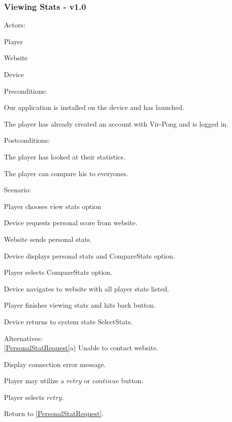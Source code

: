 \documentclass[12pt]{article}
\newenvironment{itemize*}%
  {\begin{itemize}%
  	\setlength{\parsep}{0pt}
    \setlength{\itemsep}{0pt}%
    \setlength{\parskip}{0pt}}%
  {\end{itemize}}
\newenvironment{enumerate*}%
  {\begin{enumerate}%
  	\setlength{\parsep}{0pt}
    \setlength{\itemsep}{0pt}%
    \setlength{\parskip}{0pt}}%
  {\end{enumerate}}
\begin{document}
\subsubsection*{Viewing Stats - v1.0}
Actors:
\begin{itemize*}
\item Player
\item Website
\item Device
\end{itemize*}
Preconditions:
\begin{itemize*}
\item Our application is installed on the device and has launched.
\item The player has already created an account with Vir-Pong and is logged in.
\end{itemize*}
Postconditions:
\begin{itemize*}
\item The player has looked at their statistics.
\item The player can compare his to everyones.
\end{itemize*}
Scenario:
\begin{enumerate*}
\item \label{SelectStats}Player chooses view stats option
\item \label{PersonalStatRequest}Device requests personal score from website.
\item Website sends personal stats.
\item Device displays personal stats and CompareStats option.
\item \label{CompareStats}Player selects CompareStats option.
\item Device navigates to website with all player stats listed.
\item \label{Back}Player finishes viewing stats and hits back button.
\item Device returns to system state SelectStats.
\end{enumerate*}
Alternatives:\\
\ref{PersonalStatRequest}a) Unable to contact website.
\begin{enumerate*}
\item Display connection error message.
\item Player may utilize a $retry$ or $continue$ button.
\item Player selects $retry$.
\item Return to \ref{PersonalStatRequest}.
\end{enumerate*}
\end{document}
